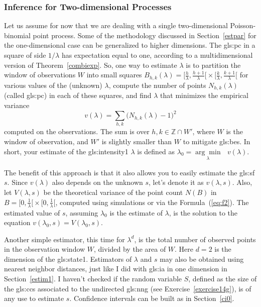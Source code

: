 \documentclass[10pt]{article}
\begin{document}
\subsubsection{Inference for Two-dimensional Processes}\label{spa1}

Let us assume for now that we are dealing with a single two-dimensional Poisson-binomial point process. Some of the methodology  discussed in Section~\ref{estpar} for the one-dimensional case can be generalized to higher dimensions. The
\gls{gls:pc} in a square of side
$1/\lambda$ has expectation equal to one, according to a multidimensional version of Theorem~\ref{combiexp}. So, one way to estimate $\lambda$ is to partition the window of observations $W$ into small squares $B_{h,k}(\lambda)=\Big[\frac{h}{\lambda}, \frac{h+1}{\lambda}\Big[ \times
\Big[\frac{k}{\lambda}, \frac{k+1}{\lambda}\Big[$ for various values of the (unknown) $\lambda$,
compute the number of points $N_{h,k}(\lambda)$ (called \gls{gls:pc}) in each of these squares, and find $\lambda$ that minimizes the empirical variance
$$v(\lambda)=\sum_{h,k}\Big(N_{h,k}(\lambda)-1\Big)^2$$
computed on the observations. The sum is over $h,k\in \mathbb{Z}\cap W'$, where $W$ is the window of observation,
and $W'$ is slightly smaller than $W$ to mitigate
\glspl{gls:be}. In short, your estimate of the \gls{gls:intensity1} $\lambda$ is defined as $\lambda_0=\underset{\lambda}{\arg\min} \mbox{ } v(\lambda)$.

The benefit of this approach is that it also allows you to easily estimate the \gls{gls:sf} $s$. Since $v(\lambda)$ also depends on the unknown $s$, let's denote it as
$v(\lambda,s)$. Also, let $V(\lambda,s)$ be the theoretical variance of the point count $N(B)$ in $B=\Big[0,\frac{1}{\lambda}\Big[ \times \Big[0,\frac{1}{\lambda}\Big[$, computed using simulations or via the Formula~(\ref{eq:f2}). The
estimated value of $s$, assuming $\lambda_0$ is the estimate of $\lambda$, is the solution to the equation $v(\lambda_0,s)=V(\lambda_0,s)$.

Another simple estimator, this time for $\lambda^d$, is the total number of observed points in the observation window $W$, divided by the area of $W$. Here $d=2$ is the dimension of the
\gls{gls:state1}. Estimators of $\lambda$ and $s$ may also be obtained using \textcolor{index}{nearest neighbor} distances, just like I did with
\gls{gls:ia} in one dimension in Section~\ref{estim1}. I haven't checked if the random variable $S$, defined as the size of the
\glspl{gls:cc} associated to the
 \textcolor{index}{undirected} \gls{gls:nng}
(see Exercise~\ref{exercise14g}), is of any use to estimate $s$.
\textcolor{index}{Confidence intervals} can be built as in Section~\ref{ci0}. \\
\end{document}
